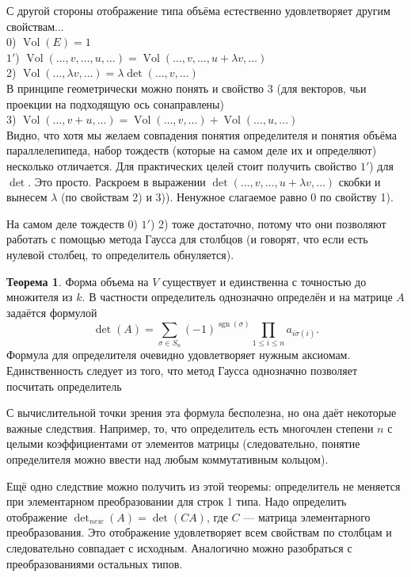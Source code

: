 \documentclass[10pt,a4paper,oneside]{book}
\theoremstyle{definition}
\newtheorem{thm}{Теорема}
\newcommand{\Vol}{\operatorname{Vol}}
\newcommand{\sgn}{\operatorname{sgn}}
\begin{document}
С другой стороны отображение типа объёма естественно удовлетворяет другим свойствам...\\
0) $\Vol(E)=1$\\
$1'$) $\Vol(\dots,v,\dots,u,\dots)=\Vol(\dots,v,\dots,u+\lambda v,\dots)$\\
2) $\Vol(\dots,\lambda v,\dots)=\lambda\det(\dots,v,\dots)$\\
В принципе геометрически можно понять и свойство 3 (для векторов, чьи проекции на подходящую ось сонаправлены)\\
3) $\Vol(\dots,v+u,\dots)=\Vol(\dots,v,\dots)+\Vol(\dots,u,\dots)$\\

Видно, что хотя мы желаем совпадения понятия определителя и понятия объёма параллелепипеда, набор тождеств (которые на самом деле их и определяют) несколько отличается. Для практических целей стоит получить свойство $1'$) для $\det$. Это просто. Раскроем в выражении $\det(\dots,v,\dots,u+\lambda v,\dots)$ скобки и вынесем $\lambda$ (по свойствам 2) и 3)). Ненужное слагаемое равно 0 по свойству 1).

На самом деле тождеств 0) $1'$) 2)  тоже достаточно, потому что они позволяют работать с помощью метода Гаусса для столбцов (и говорят, что если есть нулевой столбец, то определитель обнуляется).



\begin{thm} Форма объема на $V$ существует и единственна с точностью до множителя из $k$. В частности определитель однозначно определён и на матрице $A$ задаётся формулой $$\det(A)=\sum_{\sigma \in S_n} (-1)^{\sgn(\sigma)} \prod_{1\leq i\leq n} a_{i\sigma(i)}.$$
\proof
Формула для определителя очевидно удовлетворяет нужным аксиомам. Единственность следует из того, что метод Гаусса однозначно позволяет посчитать определитель
\end{thm}

С вычислительной точки зрения эта формула бесполезна, но она даёт некоторые важные следствия. Например, то, что определитель есть многочлен степени $n$ с целыми коэффициентами от элементов матрицы (следовательно, понятие определителя можно ввести над любым коммутативным кольцом).

Ещё одно следствие можно получить из этой теоремы: определитель не меняется при элементарном преобразовании для строк 1 типа. Надо определить отображение $\det_{new} (A)=\det(CA)$, где $C$ --- матрица элементарного преобразования. Это отображение удовлетворяет всем свойствам по столбцам и следовательно совпадает с исходным. Аналогично можно разобраться с преобразованиями остальных типов. 
\end{document}
